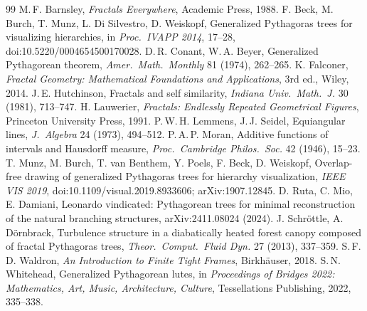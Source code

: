 \documentclass[11pt,a4paper]{article}
\theoremstyle{definition}
\theoremstyle{remark}
\begin{document}
\begin{thebibliography}{99}\small
{} M.\,F. Barnsley, \emph{Fractals Everywhere}, Academic Press, 1988.
 F. Beck, M. Burch, T. Munz, L. Di Silvestro, D. Weiskopf,
  Generalized Pythagoras trees for visualizing hierarchies, in \emph{Proc.\ IVAPP 2014},
  17--28, doi:10.5220/0004654500170028.
 D.\,R. Conant, W.\,A. Beyer, Generalized Pythagorean theorem,
  \emph{Amer.\ Math.\ Monthly} 81 (1974), 262--265.
 K. Falconer, \emph{Fractal Geometry: Mathematical Foundations and
  Applications}, 3rd ed., Wiley, 2014.
 J.\,E. Hutchinson, Fractals and self similarity,
  \emph{Indiana Univ.\ Math.\ J.} 30 (1981), 713--747.
 H. Lauwerier, \emph{Fractals: Endlessly Repeated Geometrical
  Figures}, Princeton University Press, 1991.
 P.\,W.\,H. Lemmens, J.\,J. Seidel, Equiangular lines,
  \emph{J.\ Algebra} 24 (1973), 494--512.
 P.\,A.\,P. Moran, Additive functions of intervals and Hausdorff measure,
  \emph{Proc.\ Cambridge Philos.\ Soc.} 42 (1946), 15--23.
 T. Munz, M. Burch, T. van Benthem, Y. Poels, F. Beck, D. Weiskopf,
  Overlap-free drawing of generalized Pythagoras trees for hierarchy visualization,
  \emph{IEEE VIS 2019}, doi:10.1109/visual.2019.8933606; arXiv:1907.12845.
 D. Ruta, C. Mio, E. Damiani, Leonardo vindicated: Pythagorean trees for
  minimal reconstruction of the natural branching structures, arXiv:2411.08024 (2024).
 J. Schr\"ottle, A. D\"ornbrack, Turbulence structure in a
  diabatically heated forest canopy composed of fractal Pythagoras trees,
  \emph{Theor.\ Comput.\ Fluid Dyn.} 27 (2013), 337--359.
 S.\,F.\,D. Waldron, \emph{An Introduction to Finite Tight Frames},
  Birkh\"auser, 2018.
 S.\,N. Whitehead, Generalized Pythagorean lutes, in
  \emph{Proceedings of Bridges 2022: Mathematics, Art, Music, Architecture, Culture},
  Tessellations Publishing, 2022, 335--338.
\end{thebibliography}
\end{document}
